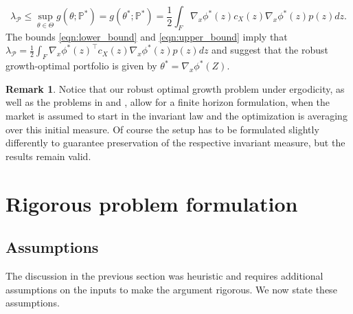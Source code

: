 \documentclass{article}
\theoremstyle{plain}
\theoremstyle{definition}
\newtheorem{remark}[lem]{Remark}
\renewcommand{\P}{\mathbb{P}}
\newcommand{\Pcal}{{\mathcal P}}
\numberwithin{lem}{section}
\begin{document}
\begin{equation} \label{eqn:upper_bound}
\lambda_\Pcal \leq \sup_{\theta \in \Theta} g(\theta;\P^*) = g( \theta^*;\P^*) = \frac{1}{2}\int_F \nabla_x \phi^*(z)c_X(z)\nabla_x\phi^*(z)p(z)dz.
\end{equation}
The bounds \eqref{eqn:lower_bound} and \eqref{eqn:upper_bound} imply that $\lambda_\Pcal = \frac{1}{2}\int_F \nabla_x \phi^*(z)^\top c_X(z)\nabla_x \phi^*(z)p(z)dz$ and suggest that the robust growth-optimal portfolio is given by $\theta^*=\nabla_x \phi^*(Z)$.

\begin{remark}
Notice that our robust optimal growth problem under ergodicity, as well as the problems in \cite{kardaras2021ergodic} and \cite{itkin2025ergodic}, allow for a finite horizon formulation, when the market is assumed to start in the invariant law and the optimization is averaging over this initial measure. Of course the setup has to be formulated slightly differently to guarantee preservation of the respective invariant measure, but the results remain valid.
\end{remark}




\section{Rigorous problem formulation} \label{sec:rigorous}
\subsection{Assumptions}
The discussion in the previous section was heuristic and requires additional assumptions on the inputs to make the argument rigorous. We now state these assumptions. 
\end{document}
